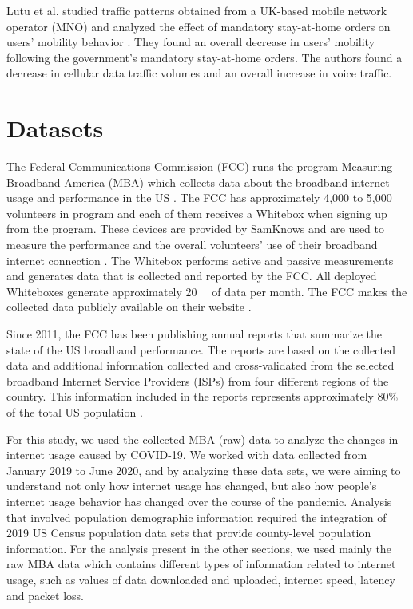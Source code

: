 \documentclass[conference,10pt]{IEEEtran}
\begin{document}
Lutu et al. studied traffic patterns obtained from a UK-based mobile network operator (MNO) and analyzed the effect of mandatory stay-at-home orders on users' mobility behavior \cite{lutu2020mobile}. They found an overall decrease in users' mobility following the government’s mandatory stay-at-home orders. The authors found a decrease in cellular data traffic volumes and an overall increase in voice traffic.

\section{Datasets}
\label{sec:datasets}


The Federal Communications Commission (FCC) runs the program Measuring Broadband America (MBA) which collects data about the broadband internet usage and performance in the US \cite{mba}. The FCC has approximately 4,000 to 5,000 volunteers in program and each of them receives a Whitebox when signing up from the program. These devices are provided by SamKnows and are used to measure the performance and the overall volunteers' use of their broadband internet connection \cite{sam}. The Whitebox performs active and passive measurements and generates data that is collected and reported by the FCC. All deployed Whiteboxes generate approximately \SI{20}{\giga\byte} of data per month. The FCC makes the collected data publicly available on their website \cite{data}.

Since 2011, the FCC has been publishing annual reports that summarize the state of the US broadband performance. The reports are based on the collected data and additional information collected and cross-validated from the selected broadband Internet Service Providers (ISPs) from four different regions of the country. This information included in the reports represents approximately 80\% of the total US population \cite{mba-studies}.

For this study, we used the collected MBA (raw) data to analyze the changes in internet usage caused by COVID-19. We worked with data collected from January 2019 to June 2020, and by analyzing these data sets, we were aiming to understand not only how internet usage has changed, but also how people's internet usage behavior has changed over the course of the pandemic.  Analysis that involved population demographic information required the integration of 2019 US Census population data sets that provide county-level population information. For the analysis present in the other sections, we used mainly the raw MBA data which contains different types of information related to internet usage, such as values of data downloaded and uploaded, internet speed, latency and packet loss.
\end{document}
